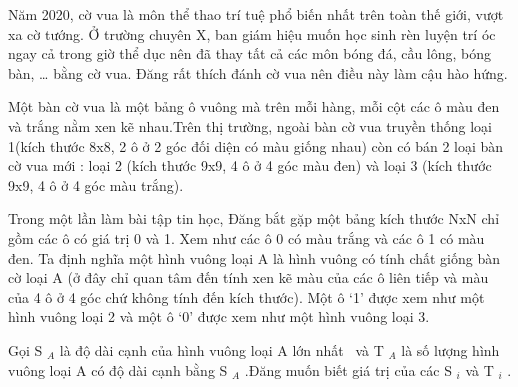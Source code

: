 Năm 2020, cờ vua là môn thể thao trí tuệ phổ biến nhất trên toàn thế giới, vượt xa cờ tướng. Ở trường chuyên X, ban giám hiệu muốn học sinh rèn luyện trí óc ngay cả trong giờ thể dục nên đã thay tất cả các môn bóng đá, cầu lông, bóng bàn, … bằng cờ vua. Đăng rất thích đánh cờ vua nên điều này làm cậu hào hứng. \textbf{}

Một bàn cờ vua là một bảng ô vuông mà trên mỗi hàng, mỗi cột các ô màu đen và trắng nằm xen kẽ nhau.Trên thị trường, ngoài bàn cờ vua truyền thống loại 1(kích thước 8x8, 2 ô ở 2 góc đối diện có màu giống nhau) còn có bán 2 loại bàn cờ vua mới : loại 2 (kích thước 9x9, 4 ô ở 4 góc màu đen) và loại 3 (kích thước 9x9, 4 ô ở 4 góc màu trắng).

Trong một lần làm bài tập tin học, Đăng bắt gặp một bảng kích thước NxN chỉ gồm các ô có giá trị 0 và 1. Xem như các ô 0 có màu trắng và các ô 1 có màu đen. Ta định nghĩa một hình vuông loại A là hình vuông có tính chất giống bàn cờ loại A (ở đây chỉ quan tâm đến tính xen kẽ màu của các ô liên tiếp và màu của 4 ô ở 4 góc chứ không tính đến kích thước). Một ô ‘1’ được xem như một hình vuông loại 2 và một ô ‘0’ được xem như một hình vuông loại 3.

Gọi S $_ A $ là độ dài cạnh của hình vuông loại A lớn nhất  và T $_ A $ là số lượng hình vuông loại A có độ dài cạnh bằng S $_ A $ .Đăng muốn biết giá trị của các S $_ i $ và T $_ i $ .

\